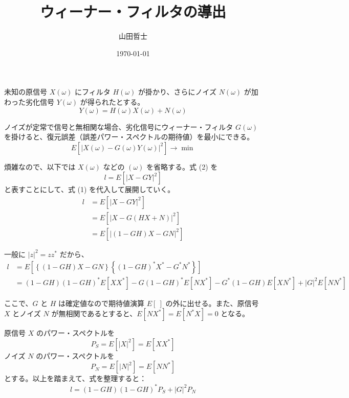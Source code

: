 \documentclass[uplatex]{jsarticle}
\title{ウィーナー・フィルタの導出}%
\date{\today}%
\author{山田哲士}%
\begin{document}
\maketitle

未知の原信号 \( X(\omega) \) にフィルタ \( H(\omega) \) が掛かり、さらにノイズ \( N(\omega) \) が加わった劣化信号 \( Y(\omega) \) が得られたとする。
\begin{equation}
Y(\omega) = H(\omega) X(\omega) + N(\omega) \tag{1}
\end{equation}

ノイズが定常で信号と無相関な場合、劣化信号にウィーナー・フィルタ \( G(\omega) \) を掛けると、復元誤差（誤差パワー・スペクトルの期待値）を最小にできる。
\begin{equation}
E\left[ \left| X(\omega) - G(\omega) Y(\omega) \right|^2 \right] \to \min \tag{2}
\end{equation}

煩雑なので、以下では \( X(\omega) \) などの \( (\omega) \) を省略する。式 (2) を
\begin{equation}
l = E\left[ | X - G Y |^2 \right] \tag{3}
\end{equation}
と表すことにして、式 (1) を代入して展開していく。
\begin{align*}
l &= E\left[ | X - G Y |^2 \right] \\
&= E\left[ | X - G(H X + N) |^2 \right] \\
&= E\left[ | (1 - G H) X - G N |^2 \right]
\end{align*}

一般に \( |z|^2 = z z^* \) だから、
\begin{align*}
l &= E\left[ \left\{ (1 - G H) X - G N \right\} \left\{ (1 - G H)^* X^* - G^* N^* \right\} \right] \\
&= (1 - G H)(1 - G H)^* E[X X^*] - G (1 - G H)^* E[N X^*] - G^* (1 - G H) E[X N^*] + |G|^2 E[N N^*]
\end{align*}

ここで、\( G \) と \( H \) は確定値なので期待値演算 \( E[\ ] \) の外に出せる。また、原信号 \( X \) とノイズ \( N \) が無相関であるとすると、\( E[N X^*] = E[N^* X] = 0 \) となる。

原信号 \( X \) のパワー・スペクトルを
\begin{equation}
P_S = E[ |X|^2 ] = E[ X X^* ] \tag{9}
\end{equation}
ノイズ \( N \) のパワー・スペクトルを
\begin{equation}
P_N = E[ |N|^2 ] = E[ N N^* ] \tag{10}
\end{equation}
とする。以上を踏まえて、式を整理すると：
\begin{equation}
l = (1 - G H)(1 - G H)^* P_S + |G|^2 P_N \tag{12}
\end{equation}
\end{document}
